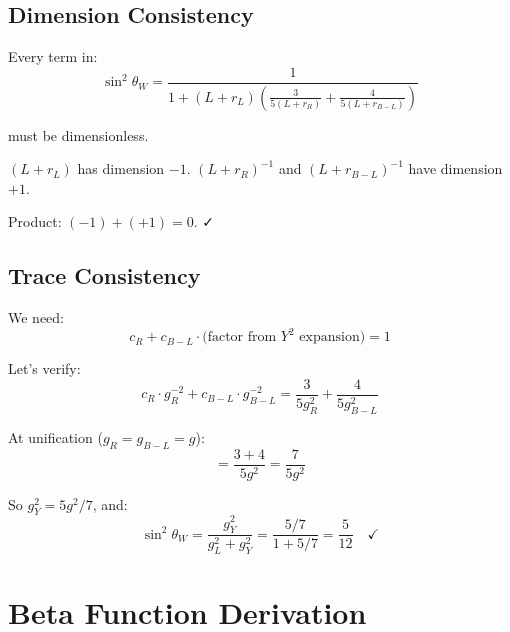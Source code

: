 \documentclass[11pt,a4paper]{article}
\begin{document}
\subsection{Dimension Consistency}
\label{subsec:dim-consistency-check}

Every term in:
\begin{equation}
\label{eq:sin2-dim-check}
\sin^2\theta_W = \frac{1}{1 + (L+r_L)\left(\frac{3}{5(L+r_R)} + \frac{4}{5(L+r_{B-L})}\right)}
\end{equation}

must be dimensionless.

$(L+r_L)$ has dimension $-1$.
$(L+r_R)^{-1}$ and $(L+r_{B-L})^{-1}$ have dimension $+1$.

Product: $(-1) + (+1) = 0$. ✓

\subsection{Trace Consistency}
\label{subsec:trace-consistency}

We need:
\begin{equation}
\label{eq:trace-check}
c_R + c_{B-L} \cdot \text{(factor from } Y^2 \text{ expansion)} = 1
\end{equation}

Let's verify:
\begin{equation}
\label{eq:trace-verify}
c_R \cdot g_R^{-2} + c_{B-L} \cdot g_{B-L}^{-2} = \frac{3}{5g_R^2} + \frac{4}{5g_{B-L}^2}
\end{equation}

At unification ($g_R = g_{B-L} = g$):
\begin{equation}
\label{eq:trace-unified}
= \frac{3+4}{5g^2} = \frac{7}{5g^2}
\end{equation}

So $g_Y^2 = 5g^2/7$, and:
\begin{equation}
\label{eq:sin2-trace-check}
\sin^2\theta_W = \frac{g_Y^2}{g_L^2 + g_Y^2} = \frac{5/7}{1 + 5/7} = \frac{5}{12} \quad \checkmark
\end{equation}

\appendix

\section{Beta Function Derivation}
\label{app:beta}
\end{document}
